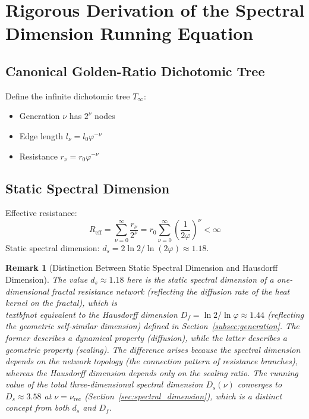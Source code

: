 \documentclass[12pt,a4paper,twocolumn]{article}
\renewcommand{\phi}{\varphi}
\newtheorem{remark}[theorem]{Remark}
\begin{document}
\appendix

\section{Rigorous Derivation of the Spectral Dimension Running Equation}
\label{app:spectral_dim}

\subsection{Canonical Golden-Ratio Dichotomic Tree}
Define the infinite dichotomic tree $T_\infty$:
\begin{itemize}
\item Generation $\nu$ has $2^\nu$ nodes
\item Edge length $l_\nu = l_0 \phi^{-\nu}$
\item Resistance $r_\nu = r_0 \phi^{-\nu}$
\end{itemize}

\subsection{Static Spectral Dimension}
Effective resistance:
\[
R_{\text{eff}} = \sum_{\nu=0}^\infty \frac{r_\nu}{2^\nu} = r_0 \sum_{\nu=0}^\infty \left(\frac{1}{2\phi}\right)^\nu < \infty
\]
Static spectral dimension: $d_s = 2\ln2/\ln(2\phi) \approx 1.18$.

\begin{remark}[Distinction Between Static Spectral Dimension and Hausdorff Dimension]
The value $d_s \approx 1.18$ here is the static spectral dimension of a one-dimensional fractal resistance network (reflecting the diffusion rate of the heat kernel on the fractal), which is \\textbf{not equivalent} to the Hausdorff dimension $D_f = \ln 2/\ln\phi \approx 1.44$ (reflecting the geometric self-similar dimension) defined in Section~\ref{subsec:generation}. The former describes a dynamical property (diffusion), while the latter describes a geometric property (scaling). The difference arises because the spectral dimension depends on the network topology (the connection pattern of resistance branches), whereas the Hausdorff dimension depends only on the scaling ratio. The running value of the total three-dimensional spectral dimension $D_s(\nu)$ converges to $D_s\approx 3.58$ at $\nu=\nu_{\text{rec}}$ (Section~\ref{sec:spectral_dimension}), which is a distinct concept from both $d_s$ and $D_f$.
\end{remark}
\end{document}
